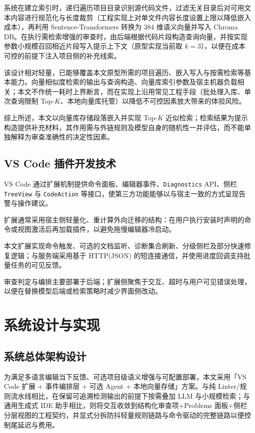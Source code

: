 系统在建立索引时，递归遍历项目目录识别源代码文件，过滤无关目录后对可用文本内容进行规范化与长度裁剪（工程实现上对单文件内容长度设置上限以降低嵌入成本），再利用 Sentence-Transformers 转换为 384 维语义向量并写入 Chroma DB。在执行需检索增强的审查时，由后端根据代码片段构造查询向量，并按实现参数小规模召回相近片段写入提示上下文（原型实现当前取 $k{=}3$），以便在成本可控的前提下注入项目侧的补充线索。

该设计相对轻量，已能够覆盖本文原型所需的项目遍历、嵌入写入与按需检索等基本能力。向量相似度检索的输出与查询构造、向量库索引参数及宿主机器负载相关；本文不作统一耗时上界断言，而在实现上沿用常见工程手段（批处理入库、单次查询限制 Top-$K$、本地向量库托管）以降低不可控因素放大带来的体验风险。

综上所述，本文以向量库存储段落嵌入并实现 Top-$K$ 近似检索；检索结果为提示构造提供补充材料，其作用需与外链规则及模型自身的随机性一并评估，而不能单独解释为审查准确性的决定性因素。

\subsection{VS Code 插件开发技术}

VS Code 通过扩展机制提供命令面板、编辑器事件、\texttt{Diagnostics} API、侧栏\texttt{TreeView} 与 \texttt{CodeAction} 等接口，使第三方功能能够以与宿主一致的方式呈现告警与操作建议\cite{microsoft2025vscodeapi}。

扩展通常采用宿主侧轻量化、重计算外向迁移的结构：在用户执行安装时声明的命令或视图激活后再加载插件，以避免拖慢编辑器冷启动。

本文扩展实现命令触发、可选的文档监听、诊断集合刷新、分级侧栏及部分快速修复逻辑；与服务端采用基于 HTTP(JSON) 的短连接通信，并使用进度回调支持批量任务的可见反馈。

审查判定与编排主要部署于后端；扩展侧聚焦于交互、超时与用户可见错误处理，以便在替换模型后端或检索策略时减少界面侧改动。

\newpage

\section{系统设计与实现}

\subsection{系统总体架构设计}

为满足多语言编辑当下反馈、可选项目级语义增强与可配置部署，本文采用「VS Code 扩展 + 事件编排层 + 可选 Agent + 本地向量存储」方案\cite{microsoft2025vscodeapi,trigo2024vscodeplugin,hou2024llmse,lewis2020retrieval}。与纯 Linter/规则流水线相比，在保留可追溯检测输出的前提下按需叠加 LLM 与小规模检索；与通用生成式 IDE 助手相比，则将交互收敛到结构化审查项$+$Problems 面板$+$侧栏分层视图的工程契约，并显式分拆防抖轻量规则链路与命令驱动的完整链路以便控制尾延迟与费用。

